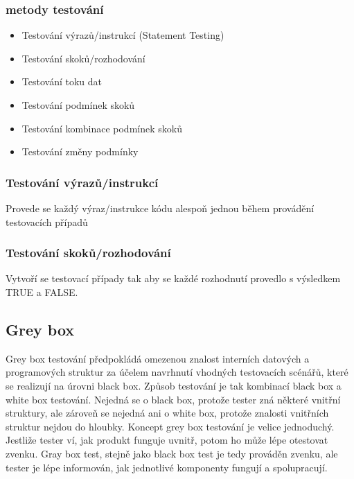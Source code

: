 \documentclass{article}
\begin{document}
\subsubsection{metody testování}
\begin{itemize}
    \item Testování výrazů/instrukcí (Statement Testing)
    \item Testování skoků/rozhodování
    \item Testování toku dat
    \item Testování podmínek skoků
    \item Testování kombinace podmínek skoků
    \item Testování změny podmínky
\end{itemize}
\subsubsection{Testování výrazů/instrukcí}
Provede se každý výraz/instrukce kódu alespoň jednou během provádění testovacích případů
\subsubsection{Testování skoků/rozhodování}
Vytvoří se testovací případy tak aby se každé rozhodnutí provedlo s výsledkem TRUE a FALSE.
\subsection{Grey box}
Grey box testování předpokládá omezenou znalost interních datových a programových struktur za účelem navrhnutí vhodných testovacích scénářů, které se realizují na úrovni black box.
Způsob testování je tak kombinací black box a white box testování. Nejedná se o black box, protože tester zná některé vnitřní struktury, ale zároveň se nejedná ani o white box, protože znalosti vnitřních struktur nejdou do hloubky. Koncept grey box testování je velice jednoduchý. Jestliže tester ví, jak produkt funguje uvnitř, potom ho může lépe otestovat zvenku. Gray box test, stejně jako black box test je tedy prováděn zvenku, ale tester je lépe informován, jak jednotlivé komponenty fungují a spolupracují.
\end{document}
